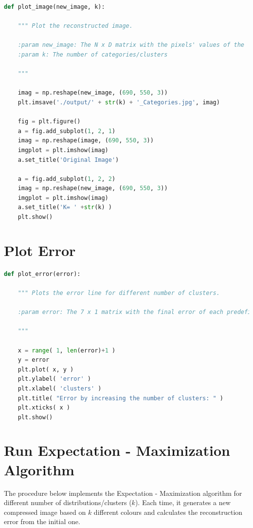 \documentclass[11pt]{article}
\begin{document}
\begin{lstlisting}[language = Python]
    def plot_image(new_image, k):
     
    """ Plot the reconstructed image.
    
    :param new_image: The N x D matrix with the pixels' values of the                 reconstructed image
    :param k: The number of categories/clusters
    
    """
    
    imag = np.reshape(new_image, (690, 550, 3))
    plt.imsave('./output/' + str(k) + '_Categories.jpg', imag)
    
    fig = plt.figure()
    a = fig.add_subplot(1, 2, 1)
    imag = np.reshape(image, (690, 550, 3))
    imgplot = plt.imshow(imag)
    a.set_title('Original Image')

    a = fig.add_subplot(1, 2, 2)
    imag = np.reshape(new_image, (690, 550, 3))
    imgplot = plt.imshow(imag)
    a.set_title('K= ' +str(k) )
    plt.show()
    \end{lstlisting}
    
    \section{Plot Error}
\begin{lstlisting}[language = Python]
    def plot_error(error):
    
    """ Plots the error line for different number of clusters.
  
    :param error: The 7 x 1 matrix with the final error of each predefined           number of clusters
    
    """
    
    x = range( 1, len(error)+1 )
    y = error
    plt.plot( x, y )
    plt.ylabel( 'error' )
    plt.xlabel( 'clusters' )
    plt.title( "Error by increasing the number of clusters: " )
    plt.xticks( x )
    plt.show()
    \end{lstlisting}
    
    \section{Run Expectation - Maximization Algorithm}
The procedure below implements the Expectation - Maximization algorithm for different number of distributions/clusters ($k$). Each time, it generates a new compressed image based on $k$ different colours and calculates the reconstruction error from the initial one.
\end{document}
